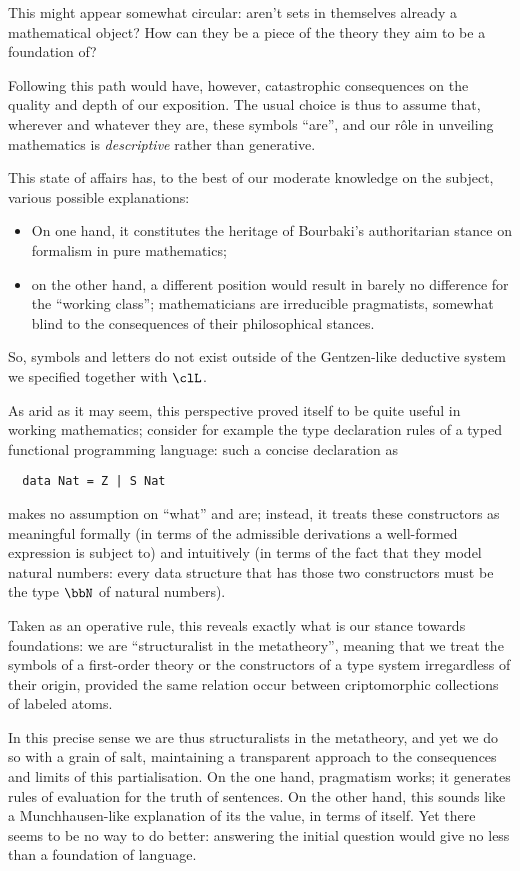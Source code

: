 This might appear somewhat circular: aren't sets in themselves already a mathematical object? How can they be a piece of the theory they aim to be a foundation of?

Following this path would have, however, catastrophic consequences on the quality and depth of our exposition. The usual choice is thus to assume that, wherever and whatever they are, these symbols ``are'', and our r\^ole in unveiling mathematics is \emph{descriptive} rather than generative.

This state of affairs has, to the best of our moderate knowledge on the subject, various possible explanations:
\begin{itemize}
  \item On one hand, it constitutes the heritage of Bourbaki's authoritarian stance on formalism in pure mathematics;
  \item on the other hand, a different position would result in barely no difference for the ``working class''; mathematicians are irreducible pragmatists, somewhat blind to the consequences of their philosophical stances.
\end{itemize}
So, symbols and letters do not exist outside of the Gentzen-like deductive system we specified together with $\clL$.

As arid as it may seem, this perspective proved itself to be quite useful in working mathematics; consider for example the type declaration rules of a typed functional programming language: such a concise declaration as
\begin{verbatim}
  data Nat = Z | S Nat
\end{verbatim}
makes no assumption on ``what''  and  are; instead, it treats these constructors as meaningful formally (in terms of the admissible derivations a well-formed expression is subject to) and intuitively (in terms of the fact that they model natural numbers: every data structure that has those two constructors must be the type $\bbN$ of natural numbers).

Taken as an operative rule, this reveals exactly what is our stance towards foundations: we are ``structuralist in the metatheory'', meaning that we treat the symbols of a first-order theory or the constructors of a type system irregardless of their origin, provided the same relation occur between criptomorphic collections of labeled atoms.

In this precise sense we are thus structuralists in the metatheory, and yet we do so with a grain of salt, maintaining a transparent approach to the consequences and limits of this partialisation. On the one hand, pragmatism works; it generates rules of evaluation for the truth of sentences. On the other hand, this sounds like a Munchhausen-like explanation of its the value, in terms of itself. Yet there seems to be no way to do better: answering the initial question would give no less than a foundation of language.

